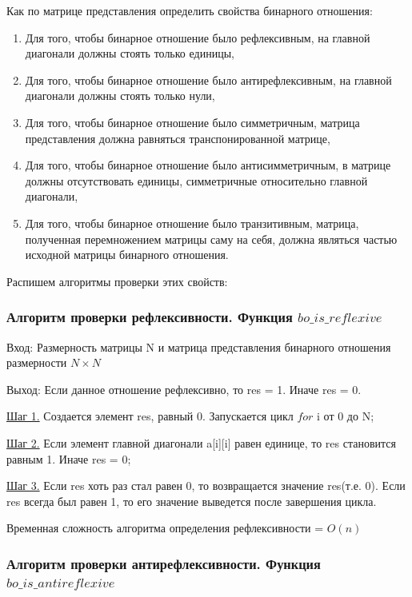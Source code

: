 \documentclass[bachelor, och, labwork]{shiza}
\begin{document}
		Как по матрице представления определить свойства бинарного отношения:
	\begin{enumerate}
		\item Для того, чтобы бинарное отношение было $\textit{рефлексивным}$, на главной  диагонали должны стоять только единицы,
		\item Для того, чтобы бинарное отношение было $\textit{антирефлексивным}$, на главной  диагонали должны стоять только нули,
		\item Для того, чтобы бинарное отношение было $\textit{симметричным}$, матрица представления должна равняться транспонированной матрице,
		\item Для того, чтобы бинарное отношение было $\textit{антисимметричным}$, в матрице должны отсутствовать единицы, симметричные относительно главной диагонали,
		\item Для того, чтобы бинарное отношение было $\textit{транзитивным}$, матрица, полученная перемножением матрицы саму на себя, должна являться частью исходной матрицы бинарного отношения.

	\end{enumerate}
				
	Распишем алгоритмы проверки этих свойств:
	
	\subsubsection{Алгоритм проверки рефлексивности. Функция $bo\_is\_reflexive$}
	
	$\textit{Вход:}$ Размерность матрицы N и матрица представления бинарного отношения размерности $N \times N$
	
	$\textit{Выход:}$  Если данное отношение рефлексивно, то res = 1. Иначе res = 0.
	
	\underline{Шаг 1.} Создается элемент res, равный 0. Запускается цикл $for$ i от 0 до N;
	
	\underline{Шаг 2.} Если элемент главной диагонали a[i][i] равен единице, то res становится равным 1. Иначе res = 0;
	
	\underline{Шаг 3.} Если res хоть раз стал равен 0, то возвращается значение res(т.е. 0). Если res всегда был равен 1, то его значение выведется после завершения цикла.
	
	Временная сложность алгоритма определения рефлексивности = $O(n)$
	
	\subsubsection{Алгоритм проверки антирефлексивности. Функция $bo\_is\_antireflexive$}
\end{document}
